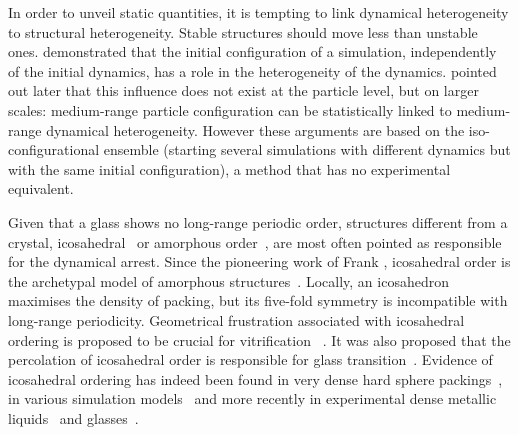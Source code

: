 In order to unveil static quantities, it is tempting to link dynamical heterogeneity to structural heterogeneity. Stable structures should move less than unstable ones. \citet{Widmer-Cooper2005} demonstrated that the initial configuration of a simulation, independently of the initial dynamics, has a role in the heterogeneity of the dynamics. \citet{Berthier2007} pointed out later that this influence does not exist at the particle level, but on larger scales: medium-range particle configuration can be statistically linked to medium-range dynamical heterogeneity. However these arguments are based on the iso-configurational ensemble (starting several simulations with different dynamics but with the same initial configuration), a method that has no experimental equivalent.

Given that a glass shows no long-range periodic order, structures different from a crystal, icosahedral~\cite{steinhardt1983boo,sadoc1999geometrical, tarjus2005fba} or amorphous order~\cite{lubchenko2007}, are most often pointed as responsible for the dynamical arrest. Since the pioneering work of Frank \cite{Frank1952}, icosahedral order is the archetypal model of amorphous structures~\citep{Spaepen2000}. Locally, an icosahedron maximises the density of packing, but its five-fold symmetry is incompatible with long-range periodicity. Geometrical frustration associated with icosahedral ordering is proposed to be crucial for vitrification ~\cite{steinhardt1983boo,sadoc1999geometrical,tarjus2005fba}. It was also proposed that the percolation of icosahedral order is responsible for glass transition~\cite{Tomida1995}.  Evidence of icosahedral ordering has indeed been found in very dense hard sphere packings~\citep{Bernal1960,Clarke1993, Anikeenko2007,Malshe2011,Charbonneau}, in various simulation models~\citep{steinhardt1983boo,Tomida1995,Doye2003,Pedersen2010,Coslovich2011} and more recently in experimental dense metallic liquids~\citep{Reichert2000,Celino2007} and glasses~\citep{Luo2004,Wang2011}.


